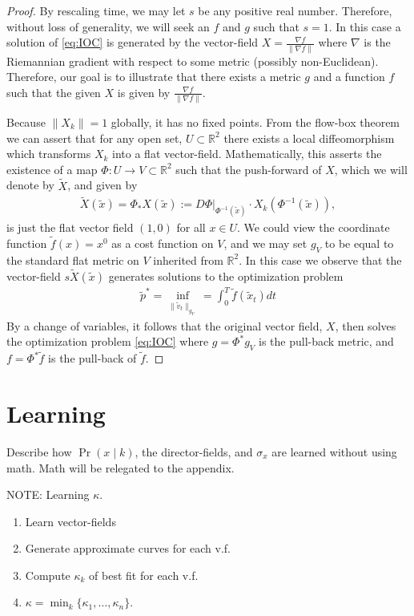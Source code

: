 \documentclass[conference]{IEEEtran}
\begin{document}
\begin{proof}
	By rescaling time, we may let $s$ be any positive real number.
	Therefore, without loss of generality, we will seek an $f$ and $g$ such that $s=1$.
	In this case a solution of \eqref{eq:IOC} is generated by the vector-field $X = \frac{\nabla f}{ \| \nabla f\|}$ where $\nabla$ is the Riemannian gradient with respect to some metric (possibly non-Euclidean).
	Therefore, our goal is to illustrate that there exists a metric $g$ and a function $f$ such that the given $X$ is given by $\frac{\nabla f}{ \| \nabla f\|}$.

	Because $\| X_k \| = 1$ globally, it has no fixed points.
	From the flow-box theorem \cite[Theorem 4.1.14]{MTA} we can assert that for any open set, $U \subset \mathbb{R}^2$ there exists a local diffeomorphism which transforms $X_k$ into a flat vector-field.
	Mathematically, this asserts the existence of a map $\Phi : U \to V \subset \mathbb{R}^2$ such that the push-forward of $X$, which we will denote by $\tilde{X}$, and given by
	\begin{align*}
		\tilde{X}(\tilde{x}) = \Phi_* X(\tilde{x}) := \left. D\Phi \right|_{\Phi^{-1}(\tilde{x}) } \cdot X_k(  \Phi^{-1}(\tilde{x}) ),
	\end{align*}
	is just the flat vector field $(1,0)$ for all $x \in U$.
	We could view the coordinate function $\tilde{f}(x) = x^0$ as a cost function on $V$,
	and we may set $g_V$ to be equal to the standard flat metric on $V$ inherited from $\mathbb{R}^2$.
	In this case we observe that the vector-field $s \tilde{X}( \tilde{x})$ generates solutions to the optimization problem
	\begin{align*}
		\tilde{p}^* = \inf_{ \| \tilde{v}_t \|_{g_V}} = \int_0^T \tilde{f}( \tilde{x}_t ) dt
	\end{align*}
	By a change of variables, it follows that the original vector field, $X$, then solves the optimization problem \eqref{eq:IOC}
	where $g = \Phi^* g_V$ is the pull-back metric, and $f = \Phi^* \tilde{f}$ is the pull-back of $\tilde{f}$.
\end{proof}

\section{Learning} \label{sec:learning}
  Describe how $\Pr(x \mid k)$, the director-fields, and $\sigma_x$ are learned without using math.
  Math will be relegated to the appendix.
  
  NOTE:  Learning $\kappa$.
  \begin{enumerate}
  	\item Learn vector-fields
	\item Generate approximate curves for each v.f.
	\item Compute $\kappa_k$ of best fit for each v.f.
	\item $\kappa = \min_k \{ \kappa_1,\dots,\kappa_n\}$.
  \end{enumerate}
  
\end{document}
